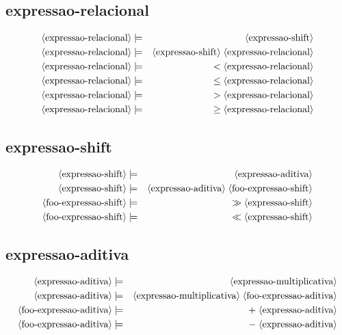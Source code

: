 \documentclass[12pt,a4papper]{article}
\newcommand{\pn}[1]{\langle \textnormal{#1} \rangle}
\newcommand{\pp}{\models}
\newcommand{\ww}{\;}
\newcommand{\sm}[1]{\textnormal{#1}}
\begin{document}
\begin{landscape}
\subsection{expressao-relacional}
\begin{eqnarray}
\pn{expressao-relacional} &\pp& \pn{expressao-shift} \\
\pn{expressao-relacional} &\pp& \pn{expressao-shift} \ww \pn{expressao-relacional} \\
              \pn{expressao-relacional} &\pp& \sm{$<$} \ww \pn{expressao-relacional} \\
              \pn{expressao-relacional} &\pp& \sm{$\leq$} \ww \pn{expressao-relacional} \\
              \pn{expressao-relacional} &\pp& \sm{$>$} \ww \pn{expressao-relacional} \\
              \pn{expressao-relacional} &\pp& \sm{$\geq$} \ww \pn{expressao-relacional}
\end{eqnarray}

        
\subsection{expressao-shift}
\begin{eqnarray}
        \pn{expressao-shift} &\pp& \pn{expressao-aditiva} \\
        \pn{expressao-shift} &\pp& \pn{expressao-aditiva} \ww \pn{foo-expressao-shift} \\
    \pn{foo-expressao-shift} &\pp& \sm{$\gg$} \ww \pn{expressao-shift} \\
    \pn{foo-expressao-shift} &\pp& \sm{$\ll$} \ww \pn{expressao-shift}
\end{eqnarray}

       
\subsection{expressao-aditiva}
\begin{eqnarray}
        \pn{expressao-aditiva} &\pp& \pn{expressao-multiplicativa}\\
        \pn{expressao-aditiva} &\pp& \pn{expressao-multiplicativa} \ww \pn{foo-expressao-aditiva} \\
    \pn{foo-expressao-aditiva} &\pp& \sm{$+$} \ww \pn{expressao-aditiva} \\
    \pn{foo-expressao-aditiva} &\pp& \sm{$-$} \ww \pn{expressao-aditiva}
\end{eqnarray}


\end{landscape}
\end{document}
